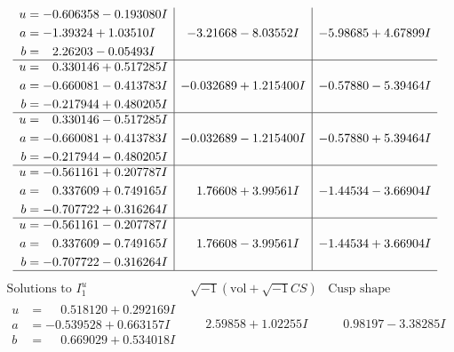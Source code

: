 \documentclass[1p]{elsarticle_modified}
\theoremstyle{definition}
\newcommand{\I}{\sqrt{-1}}
\begin{document}
$$\begin{array}{c|c|c}
\begin{aligned}
u &= -0.606358 - 0.193080 I \\
a &= -1.39324 + 1.03510 I \\
b &= \phantom{-}2.26203 - 0.05493 I\end{aligned}
 & -3.21668 - 8.03552 I & -5.98685 + 4.67899 I \\ \hline\begin{aligned}
u &= \phantom{-}0.330146 + 0.517285 I \\
a &= -0.660081 - 0.413783 I \\
b &= -0.217944 + 0.480205 I\end{aligned}
 & -0.032689 + 1.215400 I & -0.57880 - 5.39464 I \\ \hline\begin{aligned}
u &= \phantom{-}0.330146 - 0.517285 I \\
a &= -0.660081 + 0.413783 I \\
b &= -0.217944 - 0.480205 I\end{aligned}
 & -0.032689 - 1.215400 I & -0.57880 + 5.39464 I \\ \hline\begin{aligned}
u &= -0.561161 + 0.207787 I \\
a &= \phantom{-}0.337609 + 0.749165 I \\
b &= -0.707722 + 0.316264 I\end{aligned}
 & \phantom{-}1.76608 + 3.99561 I & -1.44534 - 3.66904 I \\ \hline\begin{aligned}
u &= -0.561161 - 0.207787 I \\
a &= \phantom{-}0.337609 - 0.749165 I \\
b &= -0.707722 - 0.316264 I\end{aligned}
 & \phantom{-}1.76608 - 3.99561 I & -1.44534 + 3.66904 I\\
 \hline 
 \end{array}$$\newpage$$\begin{array}{c|c|c}  
\text{Solutions to }I^u_{1}& \I (\text{vol} + \sqrt{-1}CS) & \text{Cusp shape}\\
 \hline 
\begin{aligned}
u &= \phantom{-}0.518120 + 0.292169 I \\
a &= -0.539528 + 0.663157 I \\
b &= \phantom{-}0.669029 + 0.534018 I\end{aligned}
 & \phantom{-}2.59858 + 1.02255 I & \phantom{-}0.98197 - 3.38285 I \\ \hline\begin{aligned}

\end{aligned}
\end{array}$$
\end{document}
